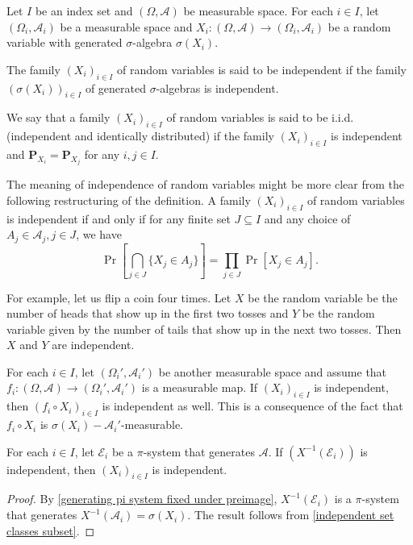 Let $I$ be an index set and $(\Omega,\mathcal{A})$ be measurable space. For each $i\in I$, let $(\Omega_i,\mathcal{A}_i)$ be a measurable space and $X_i:(\Omega,\mathcal{A})\to(\Omega_i,\mathcal{A}_i)$ be a random variable with generated $\sigma$-algebra $\sigma(X_i)$.

\begin{definition}
    The family $(X_i)_{i\in I}$ of random variables is said to be independent if the family $(\sigma(X_i))_{i\in I}$ of generated $\sigma$-algebras is independent.
\end{definition}

We say that a family $(X_i)_{i\in I}$ of random variables is said to be i.i.d. (independent and identically distributed) if the family $(X_i)_{i\in I}$ is independent and $\textbf{P}_{X_i}=\textbf{P}_{X_j}$ for any $i,j\in I$.

\vspace{2mm}
The meaning of independence of random variables might be more clear from the following restructuring of the definition. A family $(X_i)_{i\in I}$ of random variables is independent if and only if for any finite set $J\subseteq I$ and any choice of $A_j\in\mathcal{A}_j,j\in J$, we have
$$\Pr\left[\bigcap_{j\in J}\{X_j\in A_j\}\right] = \prod_{j\in J}\Pr[X_j\in A_j].$$

\vspace{1mm}
For example, let us flip a coin four times. Let $X$ be the random variable be the number of heads that show up in the first two tosses and $Y$ be the random variable given by the number of tails that show up in the next two tosses. Then $X$ and $Y$ are independent.

\vspace{2mm}
For each $i\in I$, let $(\Omega_i',\mathcal{A}_i')$ be another measurable space and assume that $f_i:(\Omega,\mathcal{A})\to(\Omega_i',\mathcal{A}_i')$ is a measurable map. If $(X_i)_{i\in I}$ is independent, then $(f_i\circ X_i)_{i\in I}$ is independent as well. This is a consequence of the fact that $f_i\circ X_i$ is $\sigma(X_i)-\mathcal{A}_i'$-measurable.

\begin{theorem}
\label{independent if generators independent}
    For each $i\in I$, let $\mathcal{E}_i$ be a $\pi$-system that generates $\mathcal{A}$. If $(X^{-1}(\mathcal{E}_i))$ is independent, then $(X_i)_{i\in I}$ is independent.
\end{theorem}
\begin{proof}
    By \cref{generating pi system fixed under preimage}, $X^{-1}(\mathcal{E}_i)$ is a $\pi$-system that generates $X^{-1}(\mathcal{A}_i)=\sigma(X_i)$. The result follows from \cref{independent set classes subset}.
\end{proof}

